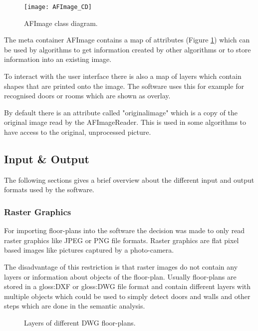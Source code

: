 \begin{figure}[h]
  \centering
      \texttt{[image: AFImage\_CD]}
  \caption{AFImage class diagram.}
  \label{fig:AFImage_CD}
\end{figure}

The meta container AFImage contains a map of attributes (Figure \ref{fig:AFImage_CD}) which can be used by algorithms to get information created by other algorithms or to store information into an existing image.

To interact with the user interface there is also a map of layers which contain shapes that are printed onto the image. The software uses this for example for recognised doors or rooms which are shown as overlay.

By default there is an attribute called "originalimage" which is a copy of the original image read by the AFImageReader. This is used in some algorithms to have access to the original, unprocessed picture.

\pagebreak

\subsection{Input \& Output}
The following sections gives a brief overview about the different input and output formats used by the software.

\subsubsection{Raster Graphics}
For importing floor-plans into the software the decision was made to only read raster graphics like JPEG or PNG file formats. Raster graphics are flat pixel based images like pictures captured by a photo-camera.

The disadvantage of this restriction is that raster images do not contain any layers or information about objects of the floor-plan. Usually floor-plans are stored in a \gls{gloss:DXF} or \gls{gloss:DWG} file format and contain different layers with multiple objects which could be used to simply detect doors and walls and other steps which are done in the semantic analysis.

\begin{figure}[h]
	\centering
	\hfill
	\hfill
	\caption{Layers of different DWG floor-plans. }
	\label{fig:layer_comparison}
\end{figure}

